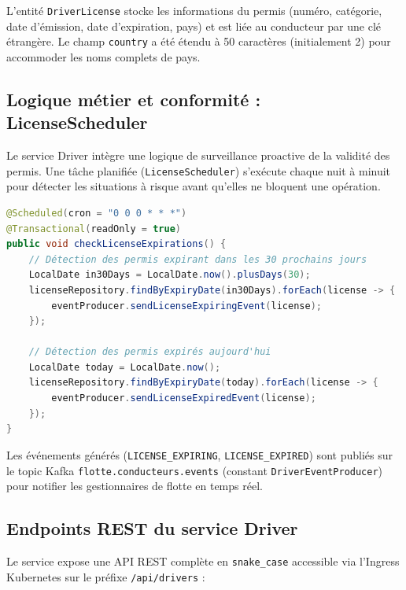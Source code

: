 \documentclass[12pt,a4paper]{article}
\begin{document}
L'entité \texttt{DriverLicense} stocke les informations du permis (numéro, catégorie, date d'émission, date d'expiration, pays) et est liée au conducteur par une clé étrangère. Le champ \texttt{country} a été étendu à 50 caractères (initialement 2) pour accommoder les noms complets de pays.

\subsection{Logique métier et conformité : LicenseScheduler}

Le service Driver intègre une logique de surveillance proactive de la validité des permis. Une tâche planifiée (\texttt{LicenseScheduler}) s'exécute chaque nuit à minuit pour détecter les situations à risque avant qu'elles ne bloquent une opération.

\begin{lstlisting}[language=Java, caption=Vérification proactive des permis (LicenseScheduler)]
@Scheduled(cron = "0 0 0 * * *")
@Transactional(readOnly = true)
public void checkLicenseExpirations() {
    // Détection des permis expirant dans les 30 prochains jours
    LocalDate in30Days = LocalDate.now().plusDays(30);
    licenseRepository.findByExpiryDate(in30Days).forEach(license -> {
        eventProducer.sendLicenseExpiringEvent(license);
    });

    // Détection des permis expirés aujourd'hui
    LocalDate today = LocalDate.now();
    licenseRepository.findByExpiryDate(today).forEach(license -> {
        eventProducer.sendLicenseExpiredEvent(license);
    });
}
\end{lstlisting}

Les événements générés (\texttt{LICENSE\_EXPIRING}, \texttt{LICENSE\_EXPIRED}) sont publiés sur le topic Kafka \texttt{flotte.conducteurs.events} (constant \texttt{DriverEventProducer}) pour notifier les gestionnaires de flotte en temps réel.

\subsection{Endpoints REST du service Driver}

Le service expose une API REST complète en \texttt{snake\_case} accessible via l'Ingress Kubernetes sur le préfixe \texttt{/api/drivers} :
\end{document}
